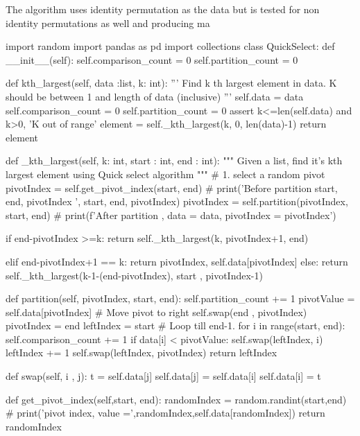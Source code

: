 \documentclass{homeworg}
\begin{document}
The algorithm uses identity permutation as the data but is tested for non identity permutations as well and producing ma
\begin{python}

import random
import pandas as pd
import collections
class QuickSelect:
    def __init__(self):
        self.comparison_count = 0
        self.partition_count = 0

    def kth_largest(self, data :list, k: int):
        '''
        Find k th largest element in data. K should be between 1 and length of data (inclusive)
        '''
        self.data = data
        self.comparison_count = 0
        self.partition_count = 0
        assert k<=len(self.data) and k>0, 'K out of range'
        element =  self._kth_largest(k, 0, len(data)-1)
        return element
    
    def _kth_largest(self, k: int, start : int, end : int):
        """
        Given a list, find it's kth largest element using Quick select algorithm
        """
        # 1. select a random pivot
        pivotIndex = self.get_pivot_index(start, end)
        # print('Before partition start, end, pivotIndex ',  start, end, pivotIndex)
        pivotIndex = self.partition(pivotIndex, start, end)
        # print(f'After partition , data = {data}, pivotIndex = {pivotIndex}')

        if end-pivotIndex >=k:
            return self._kth_largest(k, pivotIndex+1, end)
            
        elif end-pivotIndex+1 == k:
            return pivotIndex, self.data[pivotIndex]
        else:
            return self._kth_largest(k-1-(end-pivotIndex), start , pivotIndex-1)

    def partition(self, pivotIndex, start, end):
        self.partition_count += 1
        pivotValue = self.data[pivotIndex]
        # Move pivot to right
        self.swap(end , pivotIndex)
        pivotIndex = end
        leftIndex = start
        # Loop till end-1.
        for i in range(start, end):
            self.comparison_count += 1
            if data[i] < pivotValue:
                self.swap(leftIndex, i)
                leftIndex += 1
        self.swap(leftIndex, pivotIndex)
        return leftIndex
    
    def swap(self, i , j):
        t = self.data[j]
        self.data[j] = self.data[i]
        self.data[i] = t

    def get_pivot_index(self,start, end):
        randomIndex = random.randint(start,end)
        # print('pivot index, value =',randomIndex,self.data[randomIndex])
        return randomIndex


\end{python}
\end{document}
